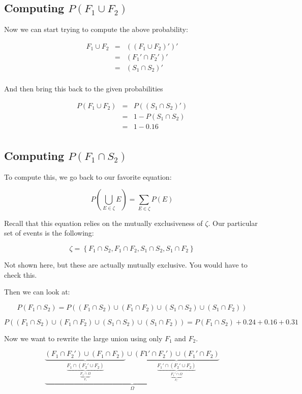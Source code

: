 \documentclass{article}
\begin{document}
\subsection*{Computing $P(F_1\cup{}F_2)$}

Now we can start trying to compute the above probability:

\[
\begin{array}{rcl}
F_1\cup F_2 & = & ((F_1\cup F_2)')' \\
            & = & (F_1'\cap F_2')' \\
            & = & (S_1\cap S_2)' \\
\end{array}
\]

And then bring this back to the given probabilities

\[
\begin{array}{rcl}
P(F_1\cup F_2) & = & P((S_1\cap S_2)') \\
               & = & 1 - P(S_1\cap S_2) \\
               & = & 1 - 0.16 \\
\end{array}
\]

\subsection*{Computing $P(F_1\cap{}S_2)$}

To compute this, we go back to our favorite equation:

\[
P\left(\bigcup_{E\in\zeta} E\right) = \sum\limits_{E\in\zeta} P(E)
\]

Recall that this equation relies on the mutually exclusiveness of
$\zeta$. Our particular set of events is the following:

\[
\zeta=\left\{F_1\cap S_2, F_1\cap F_2, S_1\cap S_2, S_1\cap F_2 \right\}
\]

Not shown here, but these are actually mutually exclusive. You would
have to check this.

Then we can look at:

\[
P(F_1\cap S_2) = P((F_1\cap S_2)\cup (F_1\cap F_2)\cup (S_1\cap S_2)\cup (S_1\cap F_2))
\]

\[
P((F_1\cap S_2)\cup (F_1\cap F_2)\cup (S_1\cap S_2)\cup (S_1\cap F_2)) = P(F_1\cap S_2) + 0.24 + 0.16 + 0.31
\]

Now we want to rewrite the large union using only $F_1$ and $F_2$.

\[
\underbrace{
\underbrace{(F_1\cap F_2')\cup(F_1\cap F_2)}_{
\underbrace{F_1\cap(F_2'\cup F_2)}_{
\underbrace{F_1\cap\Omega}_{
F_1
}
}
}\cup\underbrace{(F1'\cap F_2')\cup(F_1'\cap F_2)}_{
\underbrace{F_1'\cap(F_2'\cup F_2)}_{
\underbrace{F_1'\cap\Omega}_{
F_1'
}
}
}
}_{\Omega}
\]
\end{document}
